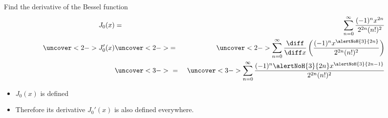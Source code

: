\begin{frame}
\begin{example}
Find the derivative of the Bessel function
\abovedisplayskip=0pt
\belowdisplayskip=0pt
\begin{eqnarray*}
J_0(x) & = & \sum_{n=0}^\infty \frac{(-1)^n x^{2n}}{2^{2n}(n!)^2}\\%
\uncover<2->{%
J_0'(x)%
}%
 & \uncover<2->{ = } &%
\uncover<2->{%
\sum_{n=0}^\infty \frac{\diff}{\diff x}\left( \frac{(-1)^n x^{\alertNoH{ 3}{ 2n}}}{2^{2n}(n!)^2}\right) %
}\\%
 & \uncover<3->{\  = \ } &%
\uncover<3->{%
\sum_{n=0}^\infty \frac{(-1)^n \alertNoH{ 3}{2n}x^{\alertNoH{ 3}{ 2n -1}}}{2^{2n}(n!)^2}%
}%
\end{eqnarray*}
\begin{itemize}
\item<4-| alert@4-5>  $J_0(x)$ is defined 
\item<6->  Therefore its derivative $J_0'(x)$ is also defined everywhere.
\end{itemize}
\end{example}
\end{frame}
